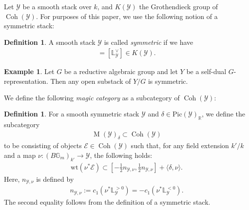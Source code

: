 \documentclass [11pt,oneside,a4paper,mathscr]{amsart}
\theoremstyle{definition}
\newtheorem{defn}[thm]{Definition}
\newtheorem{example}[thm]{Example}
\newcommand{\Y}{\mathcal{Y}}
\newcommand{\MM}{\operatorname{M}}
\newcommand{\bgm}{B\mathbb{G}_m}
\newcommand{\Coh}{\operatorname{Coh}}
\begin{document}
Let $\mathcal{Y}$ be a smooth stack over $k$, and $K(\mathcal{Y})$ the Grothendieck group of 
$\Coh(\Y)$. 
For purposes of this paper, we use the following notion of a symmetric stack:
\begin{defn}\label{def:sstack}
A smooth stack $\Y$ is called 
\textit{symmetric} 
if we have 
\begin{align*}
	[\mathbb{L}_{\mathcal{Y}}]=[\mathbb{L}_{\mathcal{Y}}^{\vee}] \in K(\Y).
	\end{align*}
    \end{defn}
\begin{example}\label{exam:quiver}
	Let $G$ be a reductive algebraic group and let $Y$ be a self-dual $G$-representation. 
	Then any open substack of $Y/G$ is symmetric. 
	\end{example}

 We define the following \textit{magic category} as a subcategory of $\Coh(\mathcal{Y})$:
 \begin{defn}\label{defn:QBY}
For a smooth symmetric stack $\mathcal{Y}$ and $\delta \in \mathrm{Pic}(\mathcal{Y})_{\mathbb{R}}$, we 
define 
the subcategory 
\begin{align}\label{MY:delta}
\MM(\mathcal{Y})_{\delta} \subset \Coh(\mathcal{Y})
\end{align}
to be consisting of objects $\mathcal{E} \in \Coh(\mathcal{Y})$ 
such that, for any field extension $k'/k$ and a
map $\nu \colon (\bgm)_{k'} \to \mathcal{Y}$, the following holds: 
\begin{align*}
    \mathrm{wt}(\nu^{\ast}\mathcal{E}) \subset 
    \left[-\frac{1}{2}n_{\mathcal{Y}, \nu}, \frac{1}{2}n_{\mathcal{Y}, \nu}   \right]
    +\langle \delta, \nu\rangle. 
\end{align*}
Here, $n_{\mathcal{Y}, \nu}$ is defined by 
\begin{align}\label{def:nV}
	n_{\mathcal{Y}, \nu}:=c_1(\nu^{\ast}\mathbb{L}_{\mathcal{Y}}^{>0})=-c_1(\nu^{\ast}\mathbb{L}_{\mathcal{Y}}^{<0}).
	\end{align}
The second equality follows from the definition of a symmetric stack. 
\end{defn}
\end{document}

